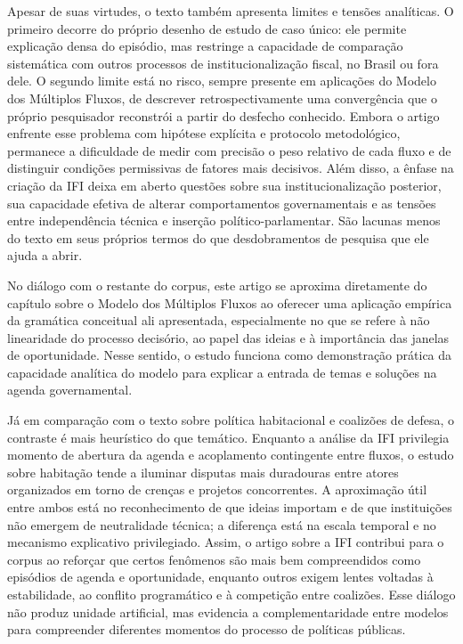 \documentclass[12pt,a4paper]{article}
\begin{document}
Apesar de suas virtudes, o texto também apresenta limites e tensões analíticas. O primeiro decorre do próprio desenho de estudo de caso único: ele permite explicação densa do episódio, mas restringe a capacidade de comparação sistemática com outros processos de institucionalização fiscal, no Brasil ou fora dele. O segundo limite está no risco, sempre presente em aplicações do Modelo dos Múltiplos Fluxos, de descrever retrospectivamente uma convergência que o próprio pesquisador reconstrói a partir do desfecho conhecido. Embora o artigo enfrente esse problema com hipótese explícita e protocolo metodológico, permanece a dificuldade de medir com precisão o peso relativo de cada fluxo e de distinguir condições permissivas de fatores mais decisivos. Além disso, a ênfase na criação da IFI deixa em aberto questões sobre sua institucionalização posterior, sua capacidade efetiva de alterar comportamentos governamentais e as tensões entre independência técnica e inserção político-parlamentar. São lacunas menos do texto em seus próprios termos do que desdobramentos de pesquisa que ele ajuda a abrir.\parencite{anonsd_sem_titulo}

No diálogo com o restante do corpus, este artigo se aproxima diretamente do capítulo sobre o Modelo dos Múltiplos Fluxos ao oferecer uma aplicação empírica da gramática conceitual ali apresentada, especialmente no que se refere à não linearidade do processo decisório, ao papel das ideias e à importância das janelas de oportunidade. Nesse sentido, o estudo funciona como demonstração prática da capacidade analítica do modelo para explicar a entrada de temas e soluções na agenda governamental.\parencite{brasil2022_abordagens_contemporaneas,anonsd_sem_titulo}

Já em comparação com o texto sobre política habitacional e coalizões de defesa, o contraste é mais heurístico do que temático. Enquanto a análise da IFI privilegia momento de abertura da agenda e acoplamento contingente entre fluxos, o estudo sobre habitação tende a iluminar disputas mais duradouras entre atores organizados em torno de crenças e projetos concorrentes. A aproximação útil entre ambos está no reconhecimento de que ideias importam e de que instituições não emergem de neutralidade técnica; a diferença está na escala temporal e no mecanismo explicativo privilegiado. Assim, o artigo sobre a IFI contribui para o corpus ao reforçar que certos fenômenos são mais bem compreendidos como episódios de agenda e oportunidade, enquanto outros exigem lentes voltadas à estabilidade, ao conflito programático e à competição entre coalizões. Esse diálogo não produz unidade artificial, mas evidencia a complementaridade entre modelos para compreender diferentes momentos do processo de políticas públicas.\parencite{ferreira2019_politica_habitacional,anonsd_sem_titulo,brasil2022_abordagens_contemporaneas}
\end{document}
